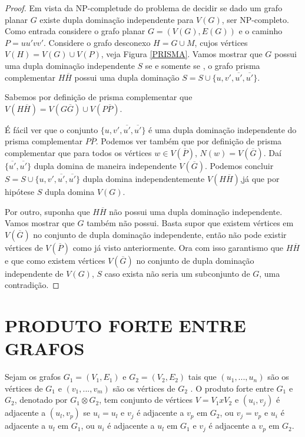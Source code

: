 \documentclass[a4paper,8pt]{article}
\theoremstyle{plain}
\begin{document}
\begin{proof}



Em vista da NP-completude do problema de decidir se dado um grafo planar $G$ existe  dupla dominação independente para $V(G)$, ser NP-completo.
Como entrada considere o grafo planar $G=(V(G),E(G))$ e o caminho $P=uu'vv'$. Considere o grafo desconexo $H=G\cup M$, cujos vértices $V(H)=V(G)\cup V(P)$, veja Figura \ref{PRISMA}. Vamos mostrar que  $G$ possui uma dupla dominação  independente $S$ se e somente se , o grafo prisma complementar $H\overline{H}$ possui uma dupla dominação $S=S\cup\{u,v',\overline{u'},\overline{u'}\}$.

Sabemos por definição de prisma complementar que  $V(H\overline{H})=V(G\overline{G})\cup V(P\overline{P})$.

É fácil ver que o conjunto  $\{u,v',\overline{u'},\overline{u'}\}$ é uma dupla dominação independente do prisma complementar $P\overline{P}$. Podemos ver também que por definição de prisma complementar que para todos os vértices $w \in V(\overline{P})$, $N(w)=V(\overline{G})$. Daí $\{\overline{u'},\overline{u'}\}$ dupla domina de maneira independente $V(\overline{G})$. Podemos concluir $S=S\cup\{u,v',\overline{u'},\overline{u'}\}$ dupla domina independentemente $V(H\overline{H})$,já que por hipótese $S$ dupla domina $V(G)$.

Por outro, suponha que $H\overline{H}$ não possui uma dupla dominação independente. Vamos mostrar que $G$ também não possui. Basta supor que existem vértices em $V(\overline{G})$ no conjunto de dupla dominação independente, então não pode existir vértices de $V(\overline{P})$ como já visto anteriormente. Ora com isso garantismo que $H\overline{H}$ e que como existem vértices  $V(\overline{G})$ no conjunto de dupla dominação independente de $V(G)$, $S$ caso exista não seria um subconjunto de $G$, uma contradição.

\end{proof}

\newpage

\section{PRODUTO FORTE ENTRE GRAFOS}
Sejam os grafos $G_1 = (V_1,E_1)$ e $G_2 = (V_2,E_2)$ tais que $(u_1,...,u_n)$ são os vértices de $G_1$ e $(v_1,...,v_m)$ são os vértices de $G_2$ . O produto forte entre $G_1$ e $G_2$, denotado por $G_1\otimes G_2$, tem conjunto de vértices $V = V_1xV_2$ e $(u_i,v_j)$ é adjacente a $(u_l,v_p)$ se $u_i = u_l$ e $v_j$ é adjacente a $v_p$ em $G_2$, ou $v_j = v_p$ e $u_i$ é adjacente a $u_l$ em $G_1$, ou $u_i$ é adjacente a $u_l$ em $G_1$ e $v_j$ é adjacente a $v_p$ em $G_2$.
\end{document}
